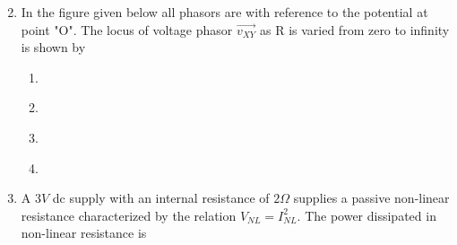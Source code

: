 \documentclass[journal]{IEEEtran}
\numberwithin{equation}{enumi}
\numberwithin{figure}{enumi}
\begin{document}
\begin{enumerate}
\begin{multicols}{2}
\begin{enumerate}
        \end{enumerate}
        \end{multicols}

    \item 
    In the figure given below all phasors are with reference to the potential at point "O". The locus of voltage phasor $\vec{v_{XY}}$ as R is varied from zero to infinity is shown by 

    \begin{figure}[H]
    \centering
    \resizebox{0.4\textwidth}{!}{}
    \end{figure}

    \begin{multicols}{2}
    \begin{enumerate}
        \item  
        \begin{figure}[H]
        \centering
        \resizebox{0.4\textwidth}{!}{}
        \end{figure}

        \item  
        \begin{figure}[H]
        \centering
        \resizebox{0.4\textwidth}{!}{}
        \end{figure}

        \item  
        \begin{figure}[H]
        \centering
        \resizebox{0.4\textwidth}{!}{}
        \end{figure}

        \item  
        \begin{figure}[H]
        \centering
        \resizebox{0.4\textwidth}{!}{}
        \end{figure}
    \end{enumerate}
    \end{multicols}

    \item 
    A $3V$ dc supply with an internal resistance of $2\Omega$ supplies a passive non-linear resistance characterized by the relation $V_{NL} = I_{NL}^2$. The power dissipated in non-linear resistance is
    \begin{enumerate}
    \end{enumerate}


\end{enumerate}
\end{document}
